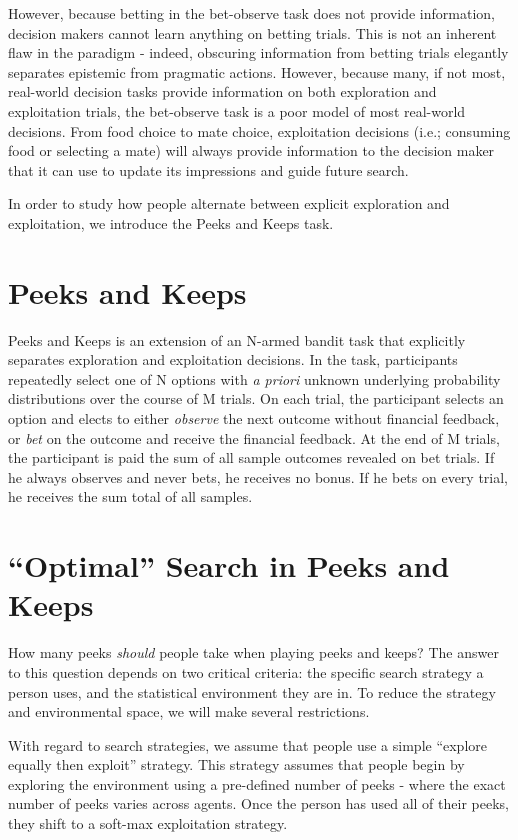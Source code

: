 \documentclass[a4paper,doc,natbib,floatsintext]{apa6}
\begin{document}
However, because betting in the bet-observe task does not provide information, decision makers cannot learn anything on betting trials. This is not an inherent flaw in the paradigm - indeed, obscuring information from betting trials elegantly separates epistemic from pragmatic actions. However, because many, if not most, real-world decision tasks provide information on both exploration and exploitation trials, the bet-observe task is a poor model of most real-world decisions. From food choice to mate choice, exploitation decisions (i.e.; consuming food or selecting a mate) will always provide information to the decision maker that it can use to update its impressions and guide future search. 

In order to study how people alternate between explicit exploration and exploitation, we introduce the Peeks and Keeps task.


\section{Peeks and Keeps}

Peeks and Keeps is an extension of an N-armed bandit task that explicitly separates exploration and exploitation decisions. In the task, participants repeatedly select one of N options with \textit{a priori} unknown underlying probability distributions over the course of M trials. On each trial, the participant selects an option and elects to either \textit{observe} the next outcome without financial feedback, or \textit{bet} on the outcome and receive the financial feedback. At the end of M trials, the participant is paid the sum of all sample outcomes revealed on bet trials. If he always observes and never bets, he receives no bonus. If he bets on every trial, he receives the sum total of all samples.



\section{``Optimal'' Search in Peeks and Keeps}

How many peeks \textit{should} people take when playing peeks and keeps? The answer to this question depends on two critical criteria: the specific search strategy a person uses, and the statistical environment they are in. To reduce the strategy and environmental space, we will make several restrictions. 

With regard to search strategies, we assume that people use a simple ``explore equally then exploit'' strategy. This strategy assumes that people begin by exploring the environment using a pre-defined number of peeks - where the exact number of peeks varies across agents. Once the person has used all of their peeks, they shift to a soft-max exploitation strategy.
\end{document}
